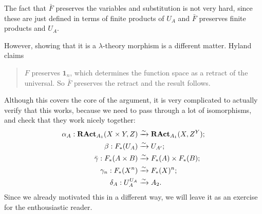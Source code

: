 \begin{remark}
  The fact that $ \bar F $ preserves the variables and substitution is not very hard, since these are just defined in terms of finite products of $ U_A $ and $ \bar F $ preserves finite products and $ U_A $.

  However, showing that it is a $ \lambda $-theory morphism is a different matter. Hyland claims
  \begin{quote}
    $ F $ preserves $ \mathbf 1_n $, which determines the function space as a retract of the universal. So $ \bar F $ preserves the retract and the result follows.
  \end{quote}
  Although this covers the core of the argument, it is very complicated to actually verify that this works, because we need to pass through a lot of isomorphisms, and check that they work nicely together:
  \begin{align*}
    \alpha_A: \mathbf{RAct}_{A_1}(X \times Y, Z) &\xrightarrow{\sim} \mathbf{RAct}_{A_1}(X, Z^Y);\\
    \beta: F_*(U_A) &\xrightarrow{\sim} U_{A^\prime};\\
    \bar \gamma: F_*(A \times B) &\xrightarrow{\sim} F_*(A) \times F_*(B);\\
    \gamma_n: F_*(X^n) &\xrightarrow{\sim} F_*(X)^n;\\
    \delta_A: U_A^{U_A} &\xrightarrow{\sim} A_2.
  \end{align*}
  Since we already motivated this in a different way, we will leave it as an exercise for the enthousiastic reader.

\end{remark}
